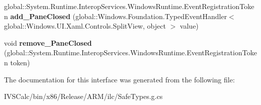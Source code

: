 \begin{DoxyCompactItemize}
\item 
\mbox{\label{interface_windows_1_1_u_i_1_1_xaml_1_1_controls_1_1_i_split_view_a5a3d86d9589e5de24342d96eaf2c1c61}} 
global\+::\+System.\+Runtime.\+Interop\+Services.\+Windows\+Runtime.\+Event\+Registration\+Token {\bfseries add\+\_\+\+Pane\+Closed} (global\+::\+Windows.\+Foundation.\+Typed\+Event\+Handler$<$ global\+::\+Windows.\+U\+I.\+Xaml.\+Controls.\+Split\+View, object $>$ value)
\item 
\mbox{\label{interface_windows_1_1_u_i_1_1_xaml_1_1_controls_1_1_i_split_view_a6450b9b0d59bee0c4df61f67cba5609e}} 
void {\bfseries remove\+\_\+\+Pane\+Closed} (global\+::\+System.\+Runtime.\+Interop\+Services.\+Windows\+Runtime.\+Event\+Registration\+Token token)
\end{DoxyCompactItemize}


The documentation for this interface was generated from the following file\+:\begin{DoxyCompactItemize}
\item 
I\+V\+S\+Calc/bin/x86/\+Release/\+A\+R\+M/ilc/Safe\+Types.\+g.\+cs\end{DoxyCompactItemize}

